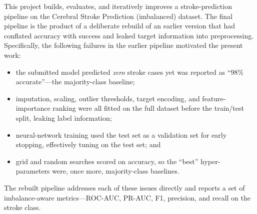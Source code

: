 \documentclass[pdflatex,sn-basic,Numbered]{sn-jnl}
\theoremstyle{thmstyleone}
\theoremstyle{thmstyletwo}
\theoremstyle{thmstylethree}
\begin{document}
This project builds, evaluates, and iteratively improves a stroke-prediction
pipeline on the Cerebral Stroke Prediction (imbalanced) dataset. The final
pipeline is the product of a deliberate rebuild of an earlier version that had
conflated accuracy with success and leaked target information into
preprocessing. Specifically, the following failures in the earlier pipeline
motivated the present work:
\begin{itemize}
\item the submitted model predicted \emph{zero} stroke cases yet was
reported as ``98\% accurate''---the majority-class baseline;
\item imputation, scaling, outlier thresholds, target encoding, and
feature-importance ranking were all fitted on the full dataset before the
train/test split, leaking label information;
\item neural-network training used the test set as a validation set for
early stopping, effectively tuning on the test set; and
\item grid and random searches scored on accuracy, so the ``best'' hyper-%
parameters were, once more, majority-class baselines.
\end{itemize}

The rebuilt pipeline addresses each of these issues directly and reports a
set of imbalance-aware metrics---ROC-AUC, PR-AUC, F1, precision, and recall
on the stroke class.
\end{document}
